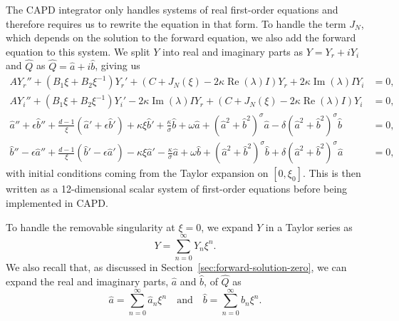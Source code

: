 \documentclass[11pt]{article}
\DeclareMathOperator{\real}{Re}
\DeclareMathOperator{\imag}{Im}
\begin{document}
The CAPD integrator only handles systems of real first-order equations
and therefore requires us to rewrite the equation in that form. To
handle the term \(J_{N}\), which depends on the solution to the
forward equation, we also add the forward equation to this system. We
split \(Y\) into real and imaginary parts as \(Y = Y_{r} + iY_{i}\)
and \(\hat{Q}\) as \(\hat{Q} = \hat{a} + i\hat{b}\), giving us
\begin{align*}
  AY_{r}'' + (B_{1}\xi + B_{2}\xi^{-1})Y_{r}' + (C + J_{N}(\xi) - 2\kappa\real(\lambda) I)Y_{r} + 2\kappa\imag(\lambda)IY_{i} &= 0,\\
  AY_{i}'' + (B_{1}\xi + B_{2}\xi^{-1})Y_{i}' - 2\kappa\imag(\lambda)IY_{r} + (C + J_{N}(\xi) - 2\kappa\real(\lambda) I)Y_{i} &= 0,\\
  \hat{a}'' + \epsilon \hat{b}'' + \frac{d - 1}{\xi}(\hat{a}' + \epsilon \hat{b}') + \kappa \xi \hat{b}' + \frac{\kappa}{\sigma}\hat{b} + \omega \hat{a} + (\hat{a}^{2} + \hat{b}^{2})^{\sigma}\hat{a} - \delta(\hat{a}^{2} + \hat{b}^{2})^{\sigma}\hat{b} &= 0,\\
  \hat{b}'' - \epsilon \hat{a}'' + \frac{d - 1}{\xi}(\hat{b}' - \epsilon \hat{a}') - \kappa \xi \hat{a}' - \frac{\kappa}{\sigma}\hat{a} + \omega \hat{b} + (\hat{a}^{2} + \hat{b}^{2})^{\sigma}\hat{b} + \delta(\hat{a}^{2} + \hat{b}^{2})^{\sigma}\hat{a} &= 0,
\end{align*}
with initial conditions coming from the Taylor expansion on
\([0, \xi_{0}]\). This is then written as a 12-dimensional scalar
system of first-order equations before being implemented in CAPD.

To handle the removable singularity at \(\xi = 0\), we expand
\(Y\) in a Taylor series as
\begin{equation*}
  Y = \sum_{n = 0}^{\infty} Y_{n}\xi^{n}.
\end{equation*}
We also recall that, as discussed in
Section~\ref{sec:forward-solution-zero}, we can expand the real and
imaginary parts, \(\hat{a}\) and \(\hat{b}\), of \(\hat{Q}\) as
\begin{equation*}
  \hat{a} = \sum_{n = 0}^{\infty} \hat{a}_{n}\xi^{n}\quad\text{and}\quad
  \hat{b} = \sum_{n = 0}^{\infty} \hat{b}_{n}\xi^{n}.
\end{equation*}
\end{document}
